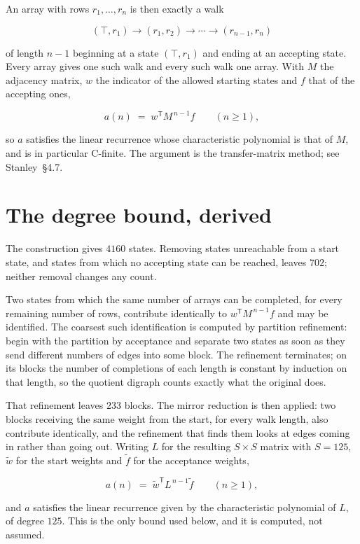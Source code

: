 \documentclass[11pt]{article}
\theoremstyle{definition}
\begin{document}
An array with rows $r_1,\dots,r_n$ is then exactly a walk

\[(\top,r_1) \to (r_1,r_2) \to \cdots \to (r_{n-1},r_n)\]

of length $n-1$ beginning at a state $(\top,r_1)$ and ending at an accepting state. Every array gives one such walk and every such walk one array. With $M$ the adjacency matrix, $w$ the indicator of the allowed starting states and $f$ that of the accepting ones,

\[a(n) \;=\; w^{\mathsf T} M^{\,n-1} f \qquad (n \ge 1),\]

so $a$ satisfies the linear recurrence whose characteristic polynomial is that of $M$, and is in particular C-finite. The argument is the transfer-matrix method; see Stanley~\S4.7.

\section{The degree bound, derived}

The construction gives $4160$ states. Removing states unreachable from a start state, and states from which no accepting state can be reached, leaves $702$; neither removal changes any count.

Two states from which the same number of arrays can be completed, for every remaining number of rows, contribute identically to $w^{\mathsf T}M^{\,n-1}f$ and may be identified. The coarsest such identification is computed by partition refinement: begin with the partition by acceptance and separate two states as soon as they send different numbers of edges into some block. The refinement terminates; on its blocks the number of completions of each length is constant by induction on that length, so the quotient digraph counts exactly what the original does.

That refinement leaves $233$ blocks. The mirror reduction is then applied: two blocks receiving the same weight from the start, for every walk length, also contribute identically, and the refinement that finds them looks at edges coming in rather than going out. Writing $L$ for the resulting $S \times S$ matrix with $S = 125$, $\tilde w$ for the start weights and $\tilde f$ for the acceptance weights,

\[a(n) \;=\; \tilde w^{\mathsf T} L^{\,n-1} \tilde f \qquad (n \ge 1),\]

and $a$ satisfies the linear recurrence given by the characteristic polynomial of $L$, of degree $125$. This is the only bound used below, and it is computed, not assumed.
\end{document}
